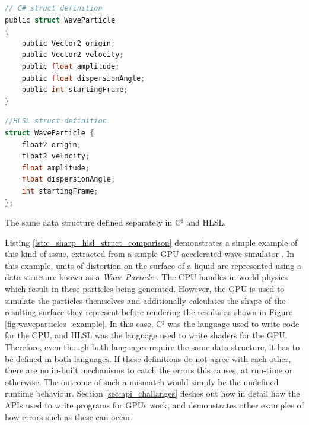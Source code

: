 \documentclass[a4paper,12pt,twoside,openright]{report}
\begin{document}
\begin{lstfloat}
\begin{lstlisting}[language=C]
// C# struct definition
public struct WaveParticle
{
    public Vector2 origin;
    public Vector2 velocity;
    public float amplitude;
    public float dispersionAngle;
    public int startingFrame;
}
\end{lstlisting}
\begin{lstlisting}[language=C]
//HLSL struct definition
struct WaveParticle {
    float2 origin;
    float2 velocity;
    float amplitude;
    float dispersionAngle;
    int startingFrame;
};
\end{lstlisting}
\label{lst:c_sharp_hlsl_struct_comparison}
\caption{The same data structure defined separately in C$^\sharp$ and HLSL.}
\end{lstfloat}

Listing \ref{lst:c_sharp_hlsl_struct_comparison} demonstrates a simple example
of this kind of issue, extracted from a simple GPU-accelerated wave simulator
\cite{WaveParticlesGPU}. In this example, units of distortion on the surface of
a liquid are represented using a data structure known as a \textit{Wave
Particle} \cite{WaveParticlesOriginalPaper}. The CPU handles in-world physics
which result in these particles being generated. However, the GPU is used to
simulate the particles themselves and additionally calculates the shape of the
resulting surface they represent before rendering the results as shown in
Figure \ref{fig:waveparticles_example}. In this case, C$^\sharp$ was the
language used to write code for the CPU, and HLSL was the language used to
write shaders for the GPU. Therefore, even though both languages require the
same data structure, it has to be defined in both languages. If these
definitions do not agree with each other, there are no in-built mechanisms to
catch the errors this causes, at run-time or otherwise. The outcome of such a
mismatch would simply be the undefined runtime behaviour. Section
\ref{sec:api_challanges} fleshes out how in detail how the APIs used to write
programs for GPUs work, and demonstrates other examples of how errors such as
these can occur.
\end{document}
